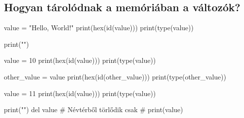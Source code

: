 \subsection{Hogyan tárolódnak a memóriában a változók?}
\begin{minipage}{0.5\textwidth}
\begin{pycode}
value = "Hello, World!"
print(hex(id(value)))
print(type(value))

print("\n")

value = 10
print(hex(id(value)))
print(type(value))

other_value = value
print(hex(id(other_value)))
print(type(other_value))

value = 11
print(hex(id(value)))
print(type(value))

print("\n")
del value  # Névtérből törlődik csak
# print(value)
\end{pycode}
\end{minipage}
\begin{minipage}{0.5\textwidth}
\end{minipage}